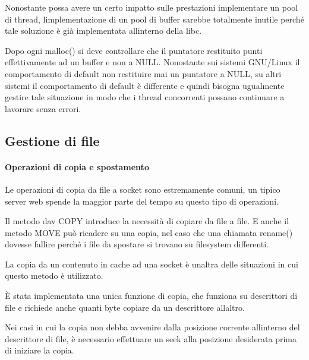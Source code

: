 \documentclass[a4paper,11pt]{article}
\begin{document}
\bigskip

{\sffamily
Nonostante possa avere un certo impatto sulle prestazioni implementare
un pool di thread, l{\textquotesingle}implementazione di un pool di
buffer sarebbe totalmente inutile perch\'e tale soluzione \`e gi\`a
implementata all{\textquotesingle}interno della libc.}


\bigskip

{\sffamily
Dopo ogni malloc() si deve controllare che il puntatore restituito punti
effettivamente ad un buffer e non a NULL. Nonostante sui sistemi
GNU/Linux il comportamento di default non restituire mai un puntatore a
NULL\cite{KER03}, su altri sistemi il comportamento di default \`e
differente e quindi bisogna ugualmente gestire tale situazione in modo
che i thread concorrenti possano continuare a lavorare senza errori.}


\bigskip

\subsection{Gestione di file}
\paragraph{Operazioni di copia e spostamento}
{\sffamily
Le operazioni di copia da file a socket sono estremamente comuni, un
tipico server web spende la maggior parte del tempo su questo tipo di
operazioni.}

{\sffamily
Il metodo dav COPY introduce la necessit\`a di copiare da file a file. E
anche il metodo MOVE pu\`o ricadere su una copia, nel caso che una
chiamata rename() dovesse fallire perch\'e i file da spostare si
trovano su filesystem differenti\cite{KER04}.}

{\sffamily
La copia da un contenuto in cache ad una socket \`e
un{\textquotesingle}altra delle situazioni in cui questo metodo \`e
utilizzato.}


\bigskip

{\sffamily
\`E stata implementata una unica funzione di copia, che funziona su
descrittori di file e richiede anche quanti byte copiare da un
descrittore all{\textquotesingle}altro.}

{\sffamily
Nei casi in cui la copia non debba avvenire dalla posizione corrente
all{\textquotesingle}interno del descrittore di file, \`e necessario
effettuare un seek alla posizione desiderata prima di iniziare la
copia.}


\bigskip
\end{document}
